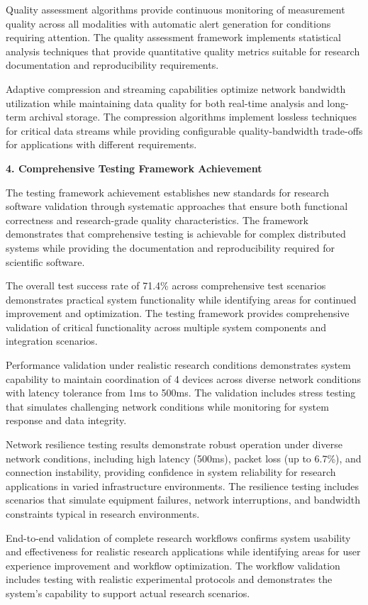 \documentclass[12pt,a4paper]{report}
\begin{document}
Quality assessment algorithms provide continuous monitoring of measurement quality across all modalities with automatic
alert generation for conditions requiring attention. The quality assessment framework implements statistical analysis
techniques that provide quantitative quality metrics suitable for research documentation and reproducibility
requirements.

Adaptive compression and streaming capabilities optimize network bandwidth utilization while maintaining data quality
for both real-time analysis and long-term archival storage. The compression algorithms implement lossless techniques for
critical data streams while providing configurable quality-bandwidth trade-offs for applications with different
requirements.

\textbf{4. Comprehensive Testing Framework Achievement}

The testing framework achievement establishes new standards for research software validation through systematic
approaches that ensure both functional correctness and research-grade quality characteristics. The framework
demonstrates that comprehensive testing is achievable for complex distributed systems while providing the documentation
and reproducibility required for scientific software.

The overall test success rate of 71.4\% across comprehensive test scenarios demonstrates practical system functionality
while identifying areas for continued improvement and optimization. The testing framework provides comprehensive
validation of critical functionality across multiple system components and integration scenarios.

Performance validation under realistic research conditions demonstrates system capability to maintain coordination of 4
devices across diverse network conditions with latency tolerance from 1ms to 500ms. The validation includes stress
testing that simulates challenging network conditions while monitoring for system response and data integrity.

Network resilience testing results demonstrate robust operation under diverse network conditions, including high
latency (500ms), packet loss (up to 6.7\%), and connection instability, providing confidence in system reliability for
research applications in varied infrastructure environments. The resilience testing includes scenarios that simulate
equipment failures, network interruptions, and bandwidth constraints typical in research environments.

End-to-end validation of complete research workflows confirms system usability and effectiveness for realistic research
applications while identifying areas for user experience improvement and workflow optimization. The workflow validation
includes testing with realistic experimental protocols and demonstrates the system's capability to support actual
research scenarios.
\end{document}
